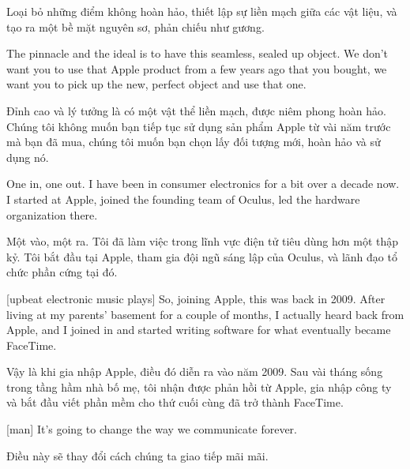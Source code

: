 \documentclass[a4paper]{article}
\begin{document}
	\begin{vietnamese-v2}
		 Loại bỏ những điểm không hoàn hảo, thiết lập sự liền mạch giữa các vật liệu, và tạo ra một bề mặt nguyên sơ, phản chiếu như gương.
	\end{vietnamese-v2}

	The pinnacle and the ideal is to have this seamless, sealed up object.
	We don't want you to use that Apple product from a few years ago that you bought, we want you to pick up the new, perfect object and use that one.

	\begin{vietnamese-v2}
		Đỉnh cao và lý tưởng là có một vật thể liền mạch, được niêm phong hoàn hảo. 
		Chúng tôi không muốn bạn tiếp tục sử dụng sản phẩm Apple từ vài năm trước mà bạn đã mua, chúng tôi muốn bạn chọn lấy đối tượng mới, hoàn hảo và sử dụng nó.
	\end{vietnamese-v2}

	One in, one out.
	I have been in consumer electronics for a bit over a decade now.
	I started at Apple, joined the founding team of Oculus, led the hardware organization there.
	
	\begin{vietnamese-v2}
		Một vào, một ra. 
		Tôi đã làm việc trong lĩnh vực điện tử tiêu dùng hơn một thập kỷ. 
		Tôi bắt đầu tại Apple, tham gia đội ngũ sáng lập của Oculus, và lãnh đạo tổ chức phần cứng tại đó.
	\end{vietnamese-v2}
	
	
	[upbeat electronic music plays]
	So, joining Apple, this was back in 2009.
	After living at my parents' basement for a couple of months, I actually heard back from Apple, and I joined in and started writing software for what eventually became FaceTime.
	
	\begin{vietnamese-v2}
		Vậy là khi gia nhập Apple, điều đó diễn ra vào năm 2009. 
		Sau vài tháng sống trong tầng hầm nhà bố mẹ, tôi nhận được phản hồi từ Apple, gia nhập công ty và bắt đầu viết phần mềm cho thứ cuối cùng đã trở thành FaceTime.
	\end{vietnamese-v2}
	
	[man] It's going to change the way we communicate forever.
	
	\begin{vietnamese-v2}
		 Điều này sẽ thay đổi cách chúng ta giao tiếp mãi mãi.
	\end{vietnamese-v2}
	
\end{document}

